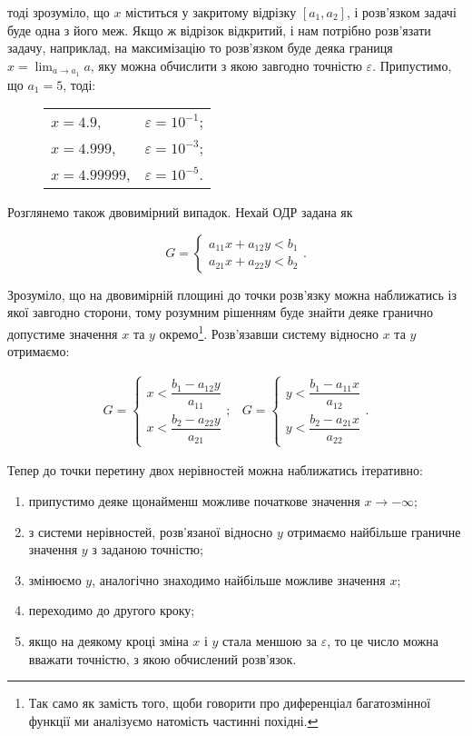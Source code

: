 \documentclass[\main/book.tex]{subfiles}
\begin{document}
тоді зрозуміло, що $x$ міститься у закритому відрізку $[a_1, a_2]$, і розв'язком задачі буде одна з його меж. Якщо ж відрізок відкритий, і нам потрібно розв'язати задачу, наприклад, на максимізацію то розв'язком буде деяка границя $x = \displaystyle \lim_{a \to a_1} a$, яку можна обчислити з якою завгодно точністю $\varepsilon$. Припустимо, що $a_1 = 5$, тоді:

\begin{figure}[!h]
 \center
 \begin{tabular}{ll}
  $x = 4.9$,     & $\varepsilon = 10^{-1}$; \\
  $x = 4.999$,   & $\varepsilon = 10^{-3}$; \\
  $x = 4.99999$, & $\varepsilon = 10^{-5}$.
 \end{tabular}
\end{figure}

Розглянемо також двовимірний випадок. Нехай ОДР задана як

\[
 G = \left\{
  \begin{array}{l}
   a_{11} x + a_{12} y < b_1 \\
   a_{21} x + a_{22} y < b_2
  \end{array}
 \right..
\]

Зрозуміло, що на двовимірній площині до точки розв'язку можна наближатись із якої завгодно сторони, тому розумним рішенням буде знайти деяке гранично допустиме значення $x$ та $y$ окремо\footnote{Так само як замість того, щоби говорити про диференціал багатозмінної функції ми аналізуємо натомість частинні похідні.}. Розв'язавши систему відносно $x$ та $y$ отримаємо:

\[
 \begin{array}{ll}
 G = \left\{
  \begin{array}{l}
   x < \dfrac{b_1 - a_{12} y}{a_{11}} \\ [8pt]
   x < \dfrac{b_2 - a_{22} y}{a_{21}}
  \end{array}
 \right.;
 &
 G = \left\{
  \begin{array}{l}
   y < \dfrac{b_1 - a_{11} x}{a_{12}} \\ [8pt]
   y < \dfrac{b_2 - a_{21} x}{a_{22}}
  \end{array}
 \right..
 \end{array}
\]

Тепер до точки перетину двох нерівностей можна наближатись ітеративно:

\begin{enumerate}
 \item припустимо деяке щонайменш можливе початкове значення ${x \to -\infty}$;
 \item з системи нерівностей, розв'язаної відносно $y$ отримаємо найбільше граничне значення $y$ з заданою точністю;
 \item змінюємо $y$, аналогічно знаходимо найбільше можливе значення $x$;
 \item переходимо до другого кроку;
 \item якщо на деякому кроці зміна $x$ і $y$ стала меншою за $\varepsilon$, то це число можна вважати точністю, з якою обчислений розв'язок.
\end{enumerate}
\end{document}
